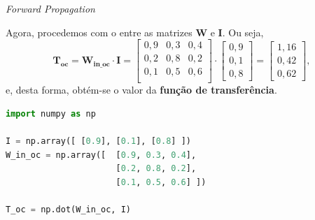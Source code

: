 \begin{frame}[fragile]{\textit{Forward Propagation} \cont}
	
	Agora, procedemos com o  entre as matrizes $\mathbf{W}$ e $\mathbf{I}$. Ou seja,
	\begin{equation*}
		\mathbf{T_{\text{oc}}} = \mathbf{W_{\text{in\_oc}}} \cdot \mathbf{I} = 
		\begin{bmatrix}
			0,9 & 0,3 & 0,4 \\ 
			0,2 & 0,8 & 0,2 \\
			0,1 & 0,5 & 0,6 \\
		\end{bmatrix}
		\cdot
		\begin{bmatrix}
			0,9 \\ 
			0,1 \\ 
			0,8 
		\end{bmatrix}
		=
		\begin{bmatrix}
			1,16 \\ 
			0,42 \\ 
			0,62 
		\end{bmatrix},
	\end{equation*}
	e, desta forma, obtém-se o valor da \textbf{função de transferência}.
	    
	\bigskip
	\bigskip
	    
    \pausenormal
	    
	\begin{lstlisting}[language=Python]
import numpy as np

I = np.array([ [0.9], [0.1], [0.8] ])
W_in_oc = np.array([  [0.9, 0.3, 0.4], 
                      [0.2, 0.8, 0.2], 
                      [0.1, 0.5, 0.6] ])

T_oc = np.dot(W_in_oc, I)\end{lstlisting}
    
\end{frame}

